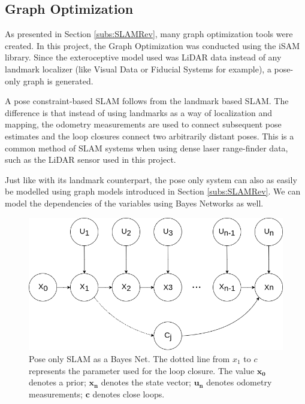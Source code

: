\documentclass[11pt]{article}
\begin{document}
	\subsection{Graph Optimization}
	\label{subs:GraphOpt}

As presented in Section \ref{subs:SLAMRev}, many graph optimization tools were created. In this project, the Graph Optimization was conducted using the iSAM library. Since the exteroceptive model used was LiDAR data instead of any landmark localizer (like Visual Data or Fiducial Systems for example), a pose-only graph is generated.

A pose constraint-based SLAM follows from the landmark based SLAM. The difference is that instead of using landmarks as a way of localization and mapping, the odometry measurements are used to connect subsequent pose estimates and the loop closures connect two arbitrarily distant poses. This is a common method of SLAM systems when using dense laser range-finder data, such as the LiDAR sensor used in this project. 

Just like with its landmark counterpart, the pose only system can also as easily be modelled using graph models introduced in Section \ref{subs:SLAMRev}. We can model the dependencies of the variables using Bayes Networks as well.
	
\begin{figure}
\begin{minipage}{0.65\textwidth}
\centering
\includegraphics[width=\textwidth]{BayesNetSLAMPoseOnly}
\end{minipage} \hfill
\begin{minipage}{0.35\textwidth}
\centering
\caption{Pose only SLAM as a Bayes Net. The dotted line from $x_1$ to $c$ represents the parameter used for the loop closure. The value $\mathbf{x_0}$ denotes a prior; $\mathbf{x_n}$ denotes the state vector; $\mathbf{u_n}$ denotes odometry measurements; $\mathbf{c}$ denotes close loops.}
\label{fig:slam2}
\end{minipage}				
\end{figure}
\end{document}

